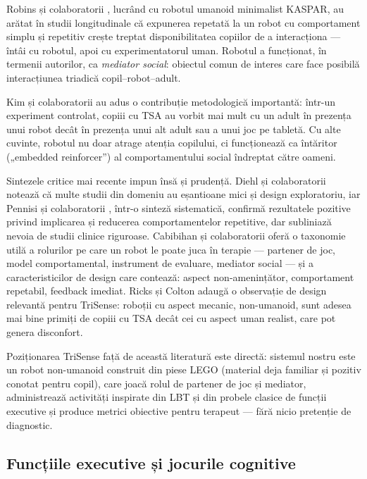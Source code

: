 Robins și colaboratorii \cite{robins2005}, lucrând cu robotul umanoid minimalist KASPAR, au arătat în studii longitudinale că expunerea repetată la un robot cu comportament simplu și repetitiv crește treptat disponibilitatea copiilor de a interacționa — întâi cu robotul, apoi cu experimentatorul uman. Robotul a funcționat, în termenii autorilor, ca \emph{mediator social}: obiectul comun de interes care face posibilă interacțiunea triadică copil–robot–adult.

Kim și colaboratorii \cite{kim2013} au adus o contribuție metodologică importantă: într-un experiment controlat, copiii cu TSA au vorbit mai mult cu un adult în prezența unui robot decât în prezența unui alt adult sau a unui joc pe tabletă. Cu alte cuvinte, robotul nu doar atrage atenția copilului, ci funcționează ca întăritor („embedded reinforcer”) al comportamentului social îndreptat către oameni.

Sintezele critice mai recente impun însă și prudență. Diehl și colaboratorii \cite{diehl2012} notează că multe studii din domeniu au eșantioane mici și design exploratoriu, iar Pennisi și colaboratorii \cite{pennisi2016}, într-o sinteză sistematică, confirmă rezultatele pozitive privind implicarea și reducerea comportamentelor repetitive, dar subliniază nevoia de studii clinice riguroase. Cabibihan și colaboratorii \cite{cabibihan2013} oferă o taxonomie utilă a rolurilor pe care un robot le poate juca în terapie — partener de joc, model comportamental, instrument de evaluare, mediator social — și a caracteristicilor de design care contează: aspect non-amenințător, comportament repetabil, feedback imediat. Ricks și Colton \cite{ricks2010} adaugă o observație de design relevantă pentru TriSense: roboții cu aspect mecanic, non-umanoid, sunt adesea mai bine primiți de copiii cu TSA decât cei cu aspect uman realist, care pot genera disconfort.

Poziționarea TriSense față de această literatură este directă: sistemul nostru este un robot non-umanoid construit din piese LEGO (material deja familiar și pozitiv conotat pentru copil), care joacă rolul de partener de joc și mediator, administrează activități inspirate din LBT și din probele clasice de funcții executive și produce metrici obiective pentru terapeut — fără nicio pretenție de diagnostic.

\subsection{Funcțiile executive și jocurile cognitive}


